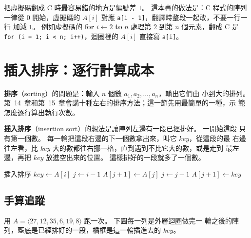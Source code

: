 把虛擬碼翻成 C 時最容易錯的地方是編號差 $1$。 這本書的做法是：C 程式的陣列一律從
$0$ 開始，虛擬碼的 $A[i]$ 對應 \texttt{a[i - 1]}，翻譯時整段一起改，不要一行一行
加減 $1$。 例如虛擬碼的 \textbf{for} $i \gets 2$ \textbf{to} $n$ 處理第 $2$ 到第
$n$ 個元素，翻成 C 是 \texttt{for (i = 1; i < n; i++)}，迴圈裡的 $A[i]$ 直接寫
\texttt{a[i]}。

\section{插入排序：逐行計算成本}
\label{sec:ana-insertion}

\textbf{排序}（sorting）的問題是：輸入 $n$ 個數 $a_1, a_2, \ldots, a_n$，輸出它們由
小到大的排列。 第~14~章和第~15~章會講十種左右的排序方法；這一節先用最簡單的一種，示
範怎麼逐行算出執行次數。

\textbf{插入排序}（insertion sort）的想法是讓陣列左邊有一段已經排好。 一開始這段
只有第一個數。 每一輪把這段右邊的下一個數拿出來，叫它 $\mathit{key}$，從這段的最
右邊往左看，比 $\mathit{key}$ 大的數都往右挪一格，直到遇到不比它大的數，或是走到
最左邊，再把 $\mathit{key}$ 放進空出來的位置。 這樣排好的一段就多了一個數。

\begin{pseudo}[label=alg:insertion]{插入排序}
        \State $\mathit{key} \gets A[i]$
        \State $j \gets i - 1$
            \State $A[j + 1] \gets A[j]$ 
            \State $j \gets j - 1$
        \EndWhile
        \State $A[j + 1] \gets \mathit{key}$
    \EndFor
\EndProcedure
\end{pseudo}

\subsection{手算追蹤}

用 $A = \langle 27, 12, 35, 6, 19, 8 \rangle$ 跑一次。 下圖每一列是外層迴圈做完一
輪之後的陣列，藍底是已經排好的一段，橘框是這一輪插進去的 $\mathit{key}$。

\begin{center}
\label{fig:ana-insertion-trace}
\end{center}

